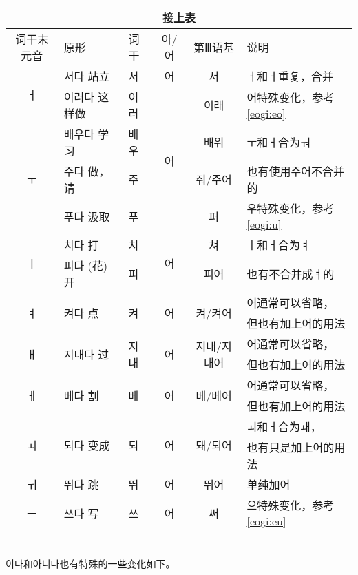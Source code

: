 \begin{tabular}{|c|l|l|c|c|l|}
    \hline
    \multicolumn{6}{|c|}{接上表}\\\hline
    词干末元音&原形&词干&아/어&第Ⅲ语基&说明\\\hline
    \multirow{2}{*}{ㅓ}&서다 站立&서&어&서&ㅓ和ㅓ重复，合并\\\cline{2-6}
    &이러다 这样做&이러&-&이래&어特殊变化，参考\ref{eogi:eo}\\\hline
    \multirow{3}{*}{ㅜ}&배우다 学习&배우&\multirow{2}{*}{어}&배워&ㅜ和ㅓ合为ㅝ\\\cline{2-3}\cline{5-6}
    &주다 做，请&주&&줘/주어&也有使用주어不合并的\\\cline{2-6}
    &푸다 汲取&푸&-&퍼&우特殊变化，参考\ref{eogi:u}\\\hline
    \multirow{2}{*}{ㅣ}&치다 打&치&\multirow{2}{*}{어}&쳐&ㅣ和ㅓ合为ㅕ\\\cline{2-3}\cline{5-6}
    &피다 (花)开&피&&피어&也有不合并成ㅕ的\\\hline
    \multirow{2}{*}{ㅕ}&\multirow{2}{*}{켜다 点}&\multirow{2}{*}{켜}&\multirow{2}{*}{어}&\multirow{2}{*}{켜/켜어}&어通常可以省略，\\
    &&&&&但也有加上어的用法\\\hline
    \multirow{2}{*}{ㅐ}&\multirow{2}{*}{지내다 过}&\multirow{2}{*}{지내}&\multirow{2}{*}{어}&\multirow{2}{*}{지내/지내어}&어通常可以省略，\\
    &&&&&但也有加上어的用法\\\hline
    \multirow{2}{*}{ㅔ}&\multirow{2}{*}{베다 割}&\multirow{2}{*}{베}&\multirow{2}{*}{어}&\multirow{2}{*}{베/베어}&어通常可以省略，\\
    &&&&&但也有加上어的用法\\\hline
    \multirow{2}{*}{ㅚ}&\multirow{2}{*}{되다 变成}&\multirow{2}{*}{되}&\multirow{2}{*}{어}&\multirow{2}{*}{돼/되어}&ㅚ和ㅓ合为ㅙ，\\
    &&&&&也有只是加上어的用法\\\hline
    ㅟ&뛰다 跳&뛰&어&뛰어&单纯加어\\\hline
    ㅡ&쓰다 写&쓰&어&써&으特殊变化，参考\ref{eogi:eu}\\\hline
\end{tabular}\\
이다和아니다也有特殊的一些变化如下。\\
